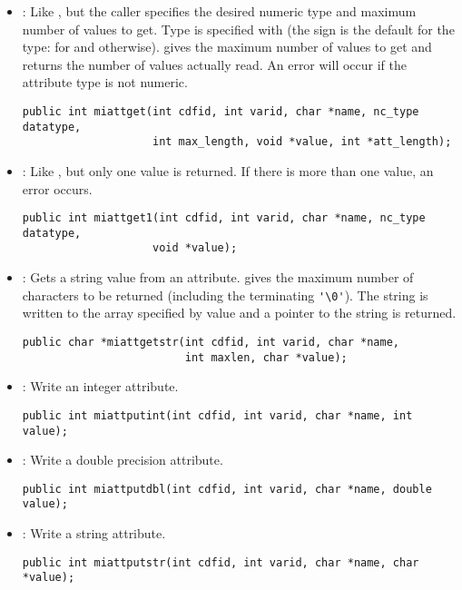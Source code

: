 \begin{itemize}
\item {} : Like , but the caller specifies
the desired numeric type and maximum number of values to get. Type is
specified with  (the sign is the default for the type:
 for  and 
otherwise).  gives the maximum number of values to
get and  returns the number of values actually read.
An error will occur if the attribute type is not numeric.
\begin{verbatim}
public int miattget(int cdfid, int varid, char *name, nc_type datatype,
                    int max_length, void *value, int *att_length);
\end{verbatim}

\item {} : Like , but only one value is
returned. If there is more than one value, an error occurs.
\begin{verbatim}
public int miattget1(int cdfid, int varid, char *name, nc_type datatype,
                    void *value);
\end{verbatim}

\item {} : Gets a string value from an attribute.
   gives the maximum number of characters to be returned
  (including the terminating \verb+'\0'+). The string is written to
  the array specified by value and a pointer to the string is
  returned.
\begin{verbatim}
public char *miattgetstr(int cdfid, int varid, char *name, 
                         int maxlen, char *value);
\end{verbatim}

\item {} : Write an integer attribute.
\begin{verbatim}
public int miattputint(int cdfid, int varid, char *name, int value);
\end{verbatim}

\item {} : Write a double precision attribute.
\begin{verbatim}
public int miattputdbl(int cdfid, int varid, char *name, double value);
\end{verbatim}

\item {} : Write a string attribute.
\begin{verbatim}
public int miattputstr(int cdfid, int varid, char *name, char *value);
\end{verbatim}


\end{itemize}
